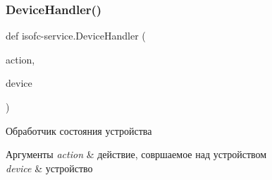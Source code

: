 \subsubsection{\texorpdfstring{Device\+Handler()}{DeviceHandler()}}
{\footnotesize\ttfamily def isofc-\/service.\+Device\+Handler (\begin{DoxyParamCaption}\item[{}]{action,  }\item[{}]{device }\end{DoxyParamCaption})}



Обработчик состояния устройства 


\begin{DoxyParams}{Аргументы}
{\em action} & действие, совршаемое над устройством \\
\hline
{\em device} & устройство \\
\hline
\end{DoxyParams}

